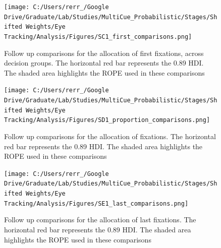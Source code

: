 \documentclass[
  english,
  man]{apa6}
\begin{document}
\begin{appendix}
\begin{figure}
\centering
\texttt{[image: C:/Users/rerr\_/Google Drive/Graduate/Lab/Studies/MultiCue\_Probabilistic/Stages/Shifted Weights/Eye Tracking/Analysis/Figures/SC1\_first\_comparisons.png]}
\caption{\label{fig:first-comparisons}Follow up comparisons for the
allocation of first fixations, across decision groups. The horizontal
red bar represents the 0.89 HDI. The shaded area highlights the ROPE
used in these comparisons}
\end{figure}

\begin{figure}
\centering
\texttt{[image: C:/Users/rerr\_/Google Drive/Graduate/Lab/Studies/MultiCue\_Probabilistic/Stages/Shifted Weights/Eye Tracking/Analysis/Figures/SD1\_proportion\_comparisons.png]}
\caption{\label{fig:proportion-comparisons}Follow up comparisons for the
allocation of fixations. The horizontal red bar represents the 0.89 HDI.
The shaded area highlights the ROPE used in these comparisons}
\end{figure}

\begin{figure}
\centering
\texttt{[image: C:/Users/rerr\_/Google Drive/Graduate/Lab/Studies/MultiCue\_Probabilistic/Stages/Shifted Weights/Eye Tracking/Analysis/Figures/SE1\_last\_comparisons.png]}
\caption{\label{fig:last-comparisons}Follow up comparisons for the
allocation of last fixations. The horizontal red bar represents the 0.89
HDI. The shaded area highlights the ROPE used in these comparisons}
\end{figure}


\end{appendix}
\end{document}
